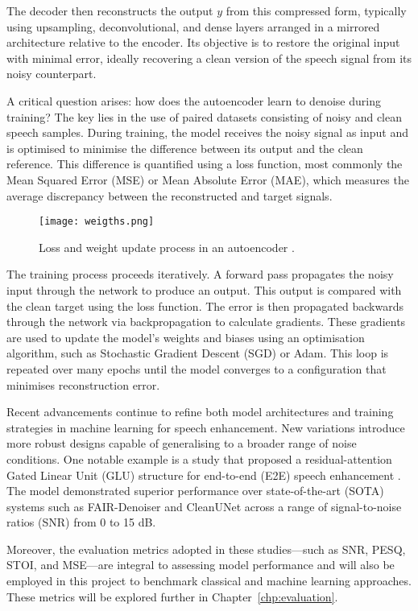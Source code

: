The decoder then reconstructs the output \(y\) from this compressed form, typically using upsampling, deconvolutional, and dense layers arranged in a mirrored architecture relative to the encoder. Its objective is to restore the original input with minimal error, ideally recovering a clean version of the speech signal from its noisy counterpart.

A critical question arises: how does the autoencoder learn to denoise during training? The key lies in the use of paired datasets consisting of noisy and clean speech samples. During training, the model receives the noisy signal as input and is optimised to minimise the difference between its output and the clean reference. This difference is quantified using a loss function, most commonly the Mean Squared Error (MSE) or Mean Absolute Error (MAE), which measures the average discrepancy between the reconstructed and target signals.

\begin{figure}[h]
    \centering
    \texttt{[image: weigths.png]}
    \caption{\label{fig:weigths} Loss and weight update process in an autoencoder \cite{epoch2021}.}
\end{figure}

The training process proceeds iteratively. A forward pass propagates the noisy input through the network to produce an output. This output is compared with the clean target using the loss function. The error is then propagated backwards through the network via backpropagation to calculate gradients. These gradients are used to update the model’s weights and biases using an optimisation algorithm, such as Stochastic Gradient Descent (SGD) or Adam. This loop is repeated over many epochs until the model converges to a configuration that minimises reconstruction error.

Recent advancements continue to refine both model architectures and training strategies in machine learning for speech enhancement. New variations introduce more robust designs capable of generalising to a broader range of noise conditions. One notable example is a study that proposed a residual-attention Gated Linear Unit (GLU) structure for end-to-end (E2E) speech enhancement \cite{kim2024residual}. The model demonstrated superior performance over state-of-the-art (SOTA) systems such as FAIR-Denoiser and CleanUNet across a range of signal-to-noise ratios (SNR) from 0 to 15 dB.

Moreover, the evaluation metrics adopted in these studies—such as SNR, PESQ, STOI, and MSE—are integral to assessing model performance and will also be employed in this project to benchmark classical and machine learning approaches. These metrics will be explored further in Chapter~\ref{chp:evaluation}.
